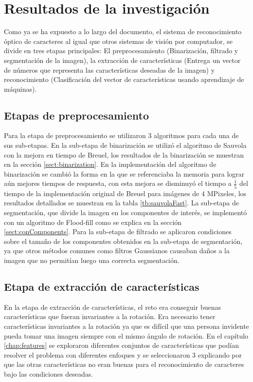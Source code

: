 \documentclass[a4paper, 11pt, oneside]{report}
\begin{document}
\section{Resultados de la investigación}
Como ya se ha expuesto a lo largo del documento, el sistema de reconocimiento óptico de caracteres al igual que otros sistemas de visión por computador, se divide en tres etapas principales: El preprocesamiento (Binarización, filtrado y segmentación de la imagen), la extracción de características (Entrega un vector de números que representa las características deseadas de la imagen) y reconocimiento (Clasificación del vector de características usando aprendizaje de máquinas).

\subsection{Etapas de preprocesamiento}
Para la etapa de preprocesamiento se utilizaron 3 algoritmos para cada una de sus sub-etapas. En la sub-etapa de binarización se utilizó el algoritmo de Sauvola con la mejora en tiempo de Breuel, los resultados de la binarización se muestran en la sección \ref{sect:binarization}. En la implementación del algoritmo de binarización se cambió la forma en la que se referenciaba la memoria para lograr aún mejores tiempos de respuesta, con esta mejora se disminuyó el tiempo a $\frac{1}{5}$ del tiempo de la implementación original de Breuel para imágenes de 4 MPixeles, los resultados detallados se muestran en la tabla \ref{tb:sauvolaFast}. La sub-etapa de segmentación, que divide la imagen en los componentes de interés, se implementó con un algoritmo de Flood-fill como se explica en la sección \ref{sect:conComponents}. Para la sub-etapa de filtrado se aplicaron condiciones sobre el tamaño de los componentes obtenidos en la sub-etapa de segmentación, ya que otros métodos comunes como filtros Gaussianos causaban daños a la imagen que no permitían luego una correcta segmentación.

\subsection{Etapa de extracción de características}
En la etapa de extracción de características, el reto era conseguir buenas características que fueran invariantes a la rotación. Era necesario tener características invariantes a la rotación ya que es difícil que una persona invidente pueda tomar una imagen siempre con el mismo ángulo de rotación. En el capítulo \ref{chap:features} se exploraron diferentes conjuntos de características que podían resolver el problema con diferentes enfoques y se seleccionaron 3 explicando por que las otras características no eran buenas para el reconocimiento de caracteres bajo las condiciones deseadas. 
\end{document}
